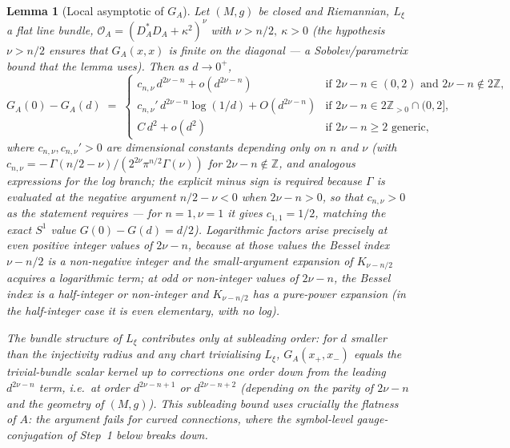\documentclass[10pt,a4paper]{amsart}
\newtheorem{lemma}{Lemma}
\newcommand{\Connection}{A}
\newcommand{\Op}{\mathcal{O}}              %
\newcommand{\Z}{\mathbb{Z}}
\newcommand{\sph}[1]{S^{#1}}
\begin{document}
\begin{lemma}[Local asymptotic of $G_A$]
\label{lem:kernel-asymptotic}
Let $(M,g)$ be closed and Riemannian, $L_\xi$ a flat line bundle,
$\Op_A=(D_A^*D_A+\kappa^2)^\nu$ with $\nu>n/2,\ \kappa>0$
(the hypothesis $\nu>n/2$ ensures that $G_A(x,x)$ is finite on the
diagonal --- a Sobolev/parametrix bound that the lemma uses). Then
as $d\to 0^+$,
\[
   G_A(0)-G_A(d) \;=\;
   \begin{cases}
      c_{n,\nu}\,d^{2\nu-n} + o(d^{2\nu-n})
      & \text{if } 2\nu-n\in(0,2)\text{ and }2\nu-n\notin 2\Z, \\[3pt]
      c_{n,\nu}'\,d^{2\nu-n}\log(1/d) + O(d^{2\nu-n})
      & \text{if } 2\nu-n\in 2\Z_{>0}\cap(0,2], \\[3pt]
      C\,d^2 + o(d^2) & \text{if } 2\nu-n\geq 2 \text{ generic,}
   \end{cases}
\]
where $c_{n,\nu}, c_{n,\nu}'>0$ are dimensional constants depending
only on $n$ and $\nu$ (with
$c_{n,\nu}=-\,\Gamma(n/2-\nu)/(2^{2\nu}\pi^{n/2}\Gamma(\nu))$
for $2\nu-n\notin\Z$, and analogous expressions for the log branch;
the explicit minus sign is required because $\Gamma$ is evaluated at
the negative argument $n/2-\nu<0$ when $2\nu-n>0$, so that
$c_{n,\nu}>0$ as the statement requires --- for $n=1,\nu=1$ it gives
$c_{1,1}=1/2$, matching the exact $\sph{1}$ value
$G(0)-G(d)=d/2$).
Logarithmic factors arise precisely at \emph{even} positive integer
values of $2\nu-n$, because at those values the Bessel index
$\nu-n/2$ is a non-negative integer and the small-argument expansion
of $K_{\nu-n/2}$ acquires a logarithmic term; at odd or non-integer
values of $2\nu-n$, the Bessel index is a half-integer or
non-integer and $K_{\nu-n/2}$ has a pure-power expansion (in the
half-integer case it is even elementary, with no log).

The bundle structure of $L_\xi$ contributes only at subleading
order: for $d$ smaller than the injectivity radius and any chart
trivialising $L_\xi$, $G_A(x_+,x_-)$ equals the trivial-bundle
scalar kernel up to corrections one order down from the leading
$d^{2\nu-n}$ term, i.e.\ at order $d^{2\nu-n+1}$ or $d^{2\nu-n+2}$
(depending on the parity of $2\nu-n$ and the geometry of $(M,g)$).
This subleading bound uses crucially the flatness of $\Connection$:
the argument fails for curved connections, where the symbol-level
gauge-conjugation of Step~1 below breaks down.
\end{lemma}
\end{document}
